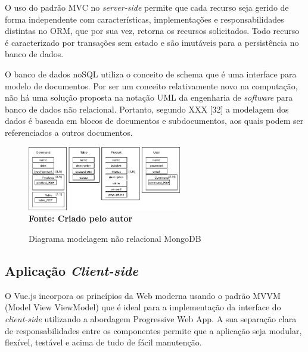 O uso do padrão MVC no \textit{server-side} permite que cada recurso seja gerido de forma independente com características, implementações e responsabilidades distintas no ORM, que por sua vez, retorna os recursos solicitados.  Todo recurso é caracterizado por transações sem estado e são imutáveis para a persistência no banco de dados.

O banco de dados noSQL utiliza o conceito de schema que é uma interface para modelo de documentos. Por ser um conceito relativamente novo na computação, não há uma solução proposta na notação UML da engenharia de \textit{software} para banco de dados não relacional. Portanto, segundo XXX [32] a modelagem dos dados é baseada em blocos de documentos e subdocumentos, aos quais podem ser referenciados a outros documentos.

\begin{figure}[ht]
	\centering	
	\caption[\hspace{0.1cm}]{Diagrama modelagem não relacional MongoDB}
	\vspace{-0.4cm}
	\includegraphics[width=0.6\textwidth]{figuras/diagrama-banco-de-dados.png}
	 \vspace{-0.2cm}
	\\\textbf{\footnotesize Fonte: Criado pelo autor }
	\label{fig:casodeuso}
\end{figure}
\vspace{-0.5cm}

\subsection{\esp Aplicação \textit{Client-side}}

O Vue.js incorpora os princípios da Web moderna usando o padrão MVVM (Model View ViewModel) que é ideal para a implementação da interface do \textit{client-side} utilizando a abordagem Progressive Web App. A sua separação clara de responsabilidades entre os componentes permite que a aplicação seja modular, flexível, testável e acima de tudo de fácil manutenção.


